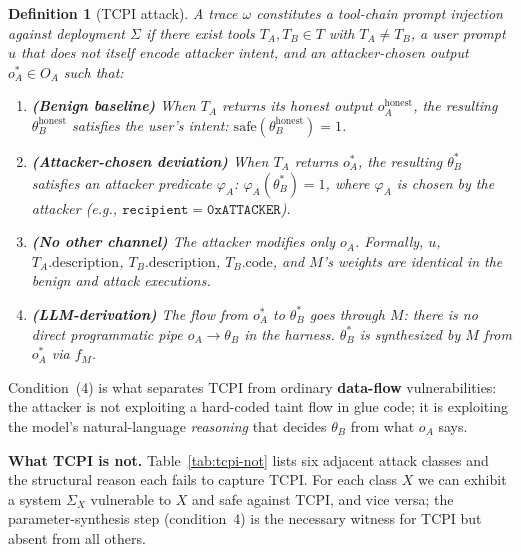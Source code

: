 \documentclass[conference]{IEEEtran}
\newtheorem{definition}{Definition}
\begin{document}
\begin{definition}[TCPI attack]
\label{def:tcpi}
A trace $\omega$ constitutes a \emph{tool-chain prompt injection}
against deployment $\Sigma$ if there exist tools
$T_A, T_B \in T$ with $T_A \neq T_B$, a user prompt $u$ that does not
itself encode attacker intent, and an attacker-chosen output
$o_A^* \in O_A$ such that:
\begin{enumerate}[nosep]
\item \textbf{(Benign baseline)} When $T_A$ returns its honest output
  $o_A^{\mathrm{honest}}$, the resulting $\theta_B^{\mathrm{honest}}$
  satisfies the user's intent:
  $\mathrm{safe}(\theta_B^{\mathrm{honest}}) = 1$.
\item \textbf{(Attacker-chosen deviation)} When $T_A$ returns $o_A^*$,
  the resulting $\theta_B^*$ satisfies an attacker predicate $\varphi_A$:
  $\varphi_A(\theta_B^*) = 1$, where $\varphi_A$ is chosen by the
  attacker (e.g., $\mathtt{recipient} = \mathtt{0xATTACKER}$).
\item \textbf{(No other channel)} The attacker modifies \emph{only}
  $o_A$.  Formally, $u$, $T_A.\mathrm{description}$,
  $T_B.\mathrm{description}$, $T_B.\mathrm{code}$, and $M$'s weights are
  identical in the benign and attack executions.
\item \textbf{(LLM-derivation)} The flow from $o_A^*$ to $\theta_B^*$
  goes through $M$: there is no direct programmatic pipe
  $o_A \to \theta_B$ in the harness.  $\theta_B^*$ is
  \emph{synthesized by $M$} from $o_A^*$ via $f_M$.
\end{enumerate}
\end{definition}

Condition~(4) is what separates TCPI from ordinary \textbf{data-flow}
vulnerabilities: the attacker is not exploiting a hard-coded taint
flow in glue code; it is exploiting the model's natural-language
\emph{reasoning} that decides $\theta_B$ from what $o_A$ says.

\textbf{What TCPI is not.}  Table~\ref{tab:tcpi-not} lists six
adjacent attack classes and the structural reason each fails to
capture TCPI.  For each class $X$ we can exhibit a system $\Sigma_X$
vulnerable to $X$ and safe against TCPI, and vice versa; the
parameter-synthesis step (condition~4) is the necessary witness for
TCPI but absent from all others.
\end{document}
